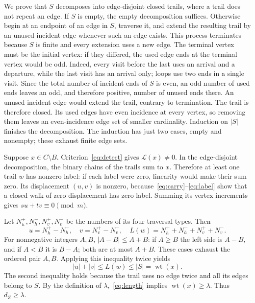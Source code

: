 \documentclass{article}
\numberwithin{equation}{section}
\begin{document}
We prove that \(S\) decomposes into edge-disjoint closed trails, where a trail
does not repeat an edge. If \(S\) is empty, the empty decomposition suffices.
Otherwise begin at an endpoint of an edge in \(S\), traverse it, and extend
the resulting trail by an unused incident edge whenever such an edge exists.
This process terminates because \(S\) is finite and every extension uses a
new edge. The terminal vertex must be the initial vertex: if they differed,
the used edge ends at the terminal vertex would be odd. Indeed, every visit
before the last uses an arrival and a departure, while the last visit has
an arrival only; loops use two ends in a single visit. Since the total number
of incident ends of \(S\) is even, an odd number of used ends leaves an odd,
and therefore positive, number of unused ends there. An unused incident edge
would extend the trail, contrary to termination. The trail is therefore
closed. Its used edges have even incidence at every vertex, so removing
them leaves an even-incidence edge set of smaller cardinality. Induction on
\(\lvert S\rvert\) finishes the decomposition. The induction has just two
cases, empty and nonempty; these exhaust finite edge sets.

Suppose \(x\in C\setminus B\). Criterion~\eqref{eq:detect} gives
\(\mathcal{L}(x)\ne0\). In the
edge-disjoint decomposition, the binary chains of the trails sum to \(x\).
Therefore at least one trail \(w\) has nonzero label: if each label were zero,
linearity would make their sum zero. Its displacement \((u,v)\) is nonzero,
because~\eqref{eq:carry}--\eqref{eq:label} show that a closed walk of zero displacement
has zero label.
Summing its vertex increments gives \(su+tv\equiv0\pmod m\).

Let \(N_h^+,N_h^-,N_v^+,N_v^-\) be the numbers of its four traversal types.
Then
\begin{equation}\label{eq:traversal-counts}
  u=N_h^+-N_h^-,\quad v=N_v^+-N_v^-,\quad
  L(w)=N_h^++N_h^-+N_v^++N_v^-.
\end{equation}
For nonnegative integers \(A,B\), \(\lvert A-B\rvert\le A+B\): if
\(A\ge B\) the left side is \(A-B\), and if \(A<B\) it is \(B-A\); both
are at most \(A+B\). These cases exhaust the ordered pair \(A,B\). Applying
this inequality twice yields
\begin{equation}\label{eq:length}
  \lvert u\rvert+\lvert v\rvert\le L(w)\le\lvert S\rvert
  =\operatorname{wt}(x).
\end{equation}
The second inequality holds because the trail uses no edge twice and all its
edges belong to \(S\). By the definition of \(\lambda\),~\eqref{eq:length} implies
\(\operatorname{wt}(x)\ge\lambda\). Thus \(d_Z\ge\lambda\).
\end{document}
